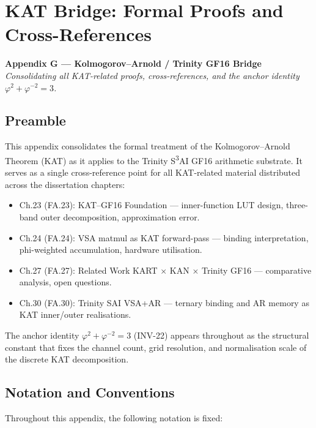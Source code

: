 \chapter{KAT Bridge: Formal Proofs and Cross-References}
\label{app:G-kat-bridge}
\label{app:kat-bridge}

\begin{center}
\textbf{Appendix G --- Kolmogorov--Arnold / Trinity GF16 Bridge} \\[1em]
\textit{Consolidating all KAT-related proofs, cross-references, and the
anchor identity $\varphi^2 + \varphi^{-2} = 3$.}
\end{center}

\section*{Preamble}

This appendix consolidates the formal treatment of the
Kolmogorov--Arnold Theorem (KAT) as it applies to the Trinity
S\textsuperscript{3}AI GF16 arithmetic substrate. It serves as a single
cross-reference point for all KAT-related material distributed across
the dissertation chapters:

\begin{itemize}
\tightlist
\item Ch.23 (FA.23): KAT--GF16 Foundation --- inner-function LUT
design, three-band outer decomposition, approximation error.
\item Ch.24 (FA.24): VSA matmul as KAT forward-pass --- binding
interpretation, phi-weighted accumulation, hardware utilisation.
\item Ch.27 (FA.27): Related Work KART $\times$ KAN $\times$ Trinity
GF16 --- comparative analysis, open questions.
\item Ch.30 (FA.30): Trinity SAI VSA+AR --- ternary binding and AR
memory as KAT inner/outer realisations.
\end{itemize}

The anchor identity $\varphi^2 + \varphi^{-2} = 3$ (INV-22) appears
throughout as the structural constant that fixes the channel count,
grid resolution, and normalisation scale of the discrete KAT
decomposition.

\section{Notation and Conventions}
\label{app:G-notation}

Throughout this appendix, the following notation is fixed:


